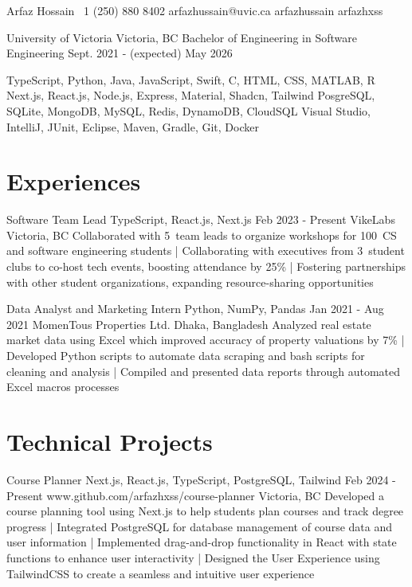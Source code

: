 \documentclass[a4paper,10pt]{article}
\begin{document}
\header
{Arfaz Hossain}				%
{\plus\ 1 (250) 880 8402}		%
{arfazhussain@uvic.ca} 			%
{arfazhussain} 				%
{arfazhxss} 				%

\education
{University of Victoria}
{Victoria, BC}
{Bachelor of Engineering in Software Engineering}
{Sept. 2021 - (expected) May 2026}

\technicalskills
{TypeScript, Python, Java, JavaScript, Swift, C\plus\plus, HTML, CSS, MATLAB, R}
{Next.js, React.js, Node.js, Express, Material, Shadcn, Tailwind}
{PosgreSQL, SQLite, MongoDB, MySQL, Redis, DynamoDB, CloudSQL}
{Visual Studio, IntelliJ, JUnit, Eclipse, Maven, Gradle, Git, Docker}

\section{Experiences}
\workexperiences
{Software Team Lead}
{TypeScript, React.js, Next.js}
{Feb 2023 - Present}
{VikeLabs}
{Victoria, BC}
{Collaborated with 5\plus\ team leads to organize workshops for 100\plus\ CS and software engineering students 
| Collaborating with executives from 3\plus\ student clubs to co-host tech events, boosting attendance by 25\% 
| Fostering partnerships with other student organizations, expanding resource-sharing opportunities 
}

\workexperiences
{Data Analyst and Marketing Intern}
{Python, NumPy, Pandas}
{Jan 2021 - Aug 2021}
{MomenTous Properties Ltd.}
{Dhaka, Bangladesh}
{Analyzed real estate market data using Excel which improved accuracy of property valuations by 7\% 
| Developed Python scripts to automate data scraping and bash scripts for cleaning and analysis
| Compiled and presented data reports through automated Excel macros processes
}

\section{Technical Projects}
\projectentry
{Course Planner}
{Next.js, React.js, TypeScript, PostgreSQL, Tailwind}
{Feb 2024 - Present}
{www.github.com/arfazhxss/course-planner}
{Victoria, BC}
{Developed a course planning tool using Next.js to help students plan courses and track degree progress 
| Integrated PostgreSQL for database management of course data and user information 
| Implemented drag-and-drop functionality in React with state functions to enhance user interactivity 
| Designed the User Experience using TailwindCSS to create a seamless and intuitive user experience
}
\end{document}
